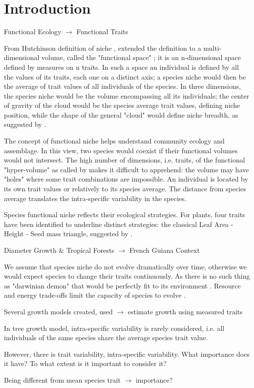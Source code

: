 \label{sec:Intro}
\section*{Introduction}

Functional Ecology $\rightarrow$ Functional Traits


From Hutchinson definition of niche \citep{hutchinson_concluding_1957}, \citet{violle_towards_2009} extended the definition to a multi-dimensional volume, called the "functional space" ; it is an n-dimensional space defined by measures on n traits. In such a space an individual is defined by all the values of its traits, each one on a distinct axis;  a species niche would then be the average of trait values of all individuals of the species. In three dimensions, the species niche would be the volume encompassing all its individuals; the center of gravity of the cloud would be the species average trait values, defining niche position, while the shape of the general "cloud" would define niche breadth, as suggested by \citet{violle_towards_2009}.

The concept of functional niche helps understand community ecology and assemblage. In this view, two species would coexist if their functional volumes would not intersect. The high number of dimensions, i.e. traits, of the functional "hyper-volume" as called by \cite{NEEDED} makes it difficult to apprehend: the volume may have "holes" where some trait combinations are impossible. An individual is located by its own trait values or relatively to its species average. The distance from species average translates the intra-specific variability in the species.

Species functional niche reflects their ecological strategies. For plants, four traits have been identified to underline distinct strategies: the classical Leaf Area - Height - Seed mass triangle, suggested by \cite{NEEDED}.

Diameter Growth \& Tropical Forests $\rightarrow$ French Guiana Context

We assume that species niche do not evolve dramatically over time, otherwise we would expect species to change their traits continuously. As there is no such thing as "darwinian demon" that would be perfectly fit to its environment \cite{NEEDED}. Resource and energy trade-offs limit the capacity of species to evolve \cite{NEEDED}.

Several growth models created, used $\rightarrow$ estimate growth using measured traits

In tree growth model, intra-specific variability is rarely considered, i.e. all individuals of the same species share the average species trait value.

However, there is trait variability, intra-specific variability. What importance does it have? To what extent is it important to consider it? 

Being different from mean species trait $\rightarrow$ importance?

